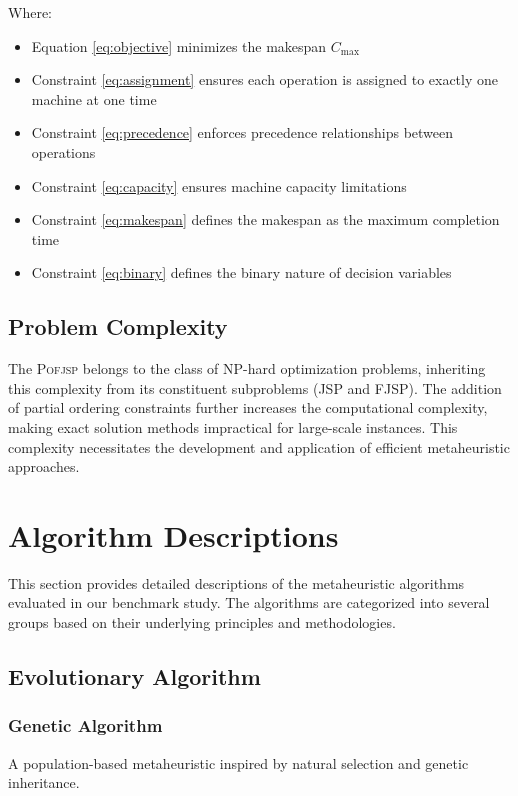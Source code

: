 \documentclass[11pt,a4paper]{article}
\newcommand{\pofjsp}{\textsc{Pofjsp}}
\begin{document}
Where:
\begin{itemize}
    \item Equation \eqref{eq:objective} minimizes the makespan $C_{\max}$
    \item Constraint \eqref{eq:assignment} ensures each operation is assigned to exactly one machine at one time
    \item Constraint \eqref{eq:precedence} enforces precedence relationships between operations
    \item Constraint \eqref{eq:capacity} ensures machine capacity limitations
    \item Constraint \eqref{eq:makespan} defines the makespan as the maximum completion time
    \item Constraint \eqref{eq:binary} defines the binary nature of decision variables
\end{itemize}

\subsection{Problem Complexity}

The \pofjsp{} belongs to the class of NP-hard optimization problems, inheriting this complexity from its constituent subproblems (JSP and FJSP). The addition of partial ordering constraints further increases the computational complexity, making exact solution methods impractical for large-scale instances. This complexity necessitates the development and application of efficient metaheuristic approaches.


\section{Algorithm Descriptions}

This section provides detailed descriptions of the metaheuristic algorithms evaluated in our benchmark study. The algorithms are categorized into several groups based on their underlying principles and methodologies.

\subsection{Evolutionary Algorithm}

\subsubsection{Genetic Algorithm}

A population-based metaheuristic inspired by natural selection and genetic inheritance.
\end{document}
